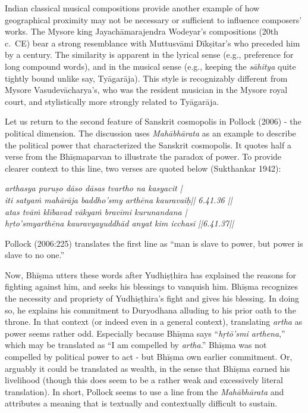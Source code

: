Indian classical musical compositions provide another example of how geographical proximity may not be necessary or sufficient to influence composers’ works. The Mysore king Jayachāmarajendra Wodeyar’s compositions (20th c.\ CE) bear a strong resemblance with Muttusvāmi Dīkṣitar’s who preceded him by a century. The similarity is apparent in the lyrical sense (e.g., preference for long compound words), and in the musical sense (e.g., keeping the {\sl sāhitya} quite tightly bound unlike say, Tyāgarāja). This style is recognizably different from Mysore Vasudevācharya’s, who was the resident musician in the Mysore royal court, and stylistically more strongly related to Tyāgarāja. 

Let us return to the second feature of Sanskrit cosmopolis in Pollock (2006) - the political dimension. The discussion uses {\sl Mahābhārata} as an example to describe the political power that characterized the Sanskrit cosmopolis. It quotes half a verse from the Bhīṣmaparvan to illustrate the paradox of power. To provide clearer context to this line, two verses are quoted below (Sukthankar 1942):
\begin{myquote}
{\sl arthasya puruṣo dāso dāsas tvartho na kasyacit |\\
iti satyaṁ mahārāja baddho'smy arthēna kauravaiḥ|| 6.41.36 ||\\
atas tvāṁ klībavad vākyaṁ bravīmi kurunandana |\\
hṛto'smyarthēna kauravyayuddhād anyat kim icchasi ||6.41.37||}
\end{myquote}

Pollock (2006:225) translates the first line as “man is slave to power, but power is slave to no one.”

Now, Bhīṣma utters these words after Yudhiṣṭhira has explained the reasons for fighting against him, and seeks his blessings to vanquish him. Bhīṣma recognizes the necessity and propriety of Yudhiṣṭhira’s fight and gives his blessing. In doing so, he explains his commitment to Duryodhana alluding to his prior oath to the throne. In that context (or indeed even in a general context), translating {\sl artha} as power seems rather odd. Especially because Bhīṣma says “{\sl hṛtō'smi arthena},” which may be translated as “I am compelled by {\sl artha}.” Bhīṣma was not compelled by political power to act - but Bhīṣma own earlier commitment. Or, arguably it could be translated as wealth, in the sense that Bhīṣma earned his livelihood (though this does seem to be a rather weak and excessively literal translation). In short, Pollock seems to use a line from the {\sl Mahābhārata} and attributes a meaning that is textually and contextually difficult to sustain.

